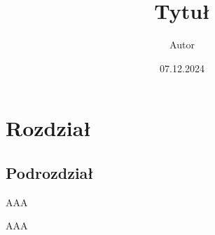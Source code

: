\documentclass[9pt]{beamer}
\title{Tytuł}
\author{Autor}
\institute{Uniwersytet Jagielloński}
\date{07.12.2024}
\begin{document}
%
\begin{frame}
\titlepage
\end{frame}
%
\section{Rozdział}
\subsection{Podrozdział}
\begin{frame}
AAA
\end{frame}
%
\begin{frame}
AAA
\end{frame}
%
\end{document}
